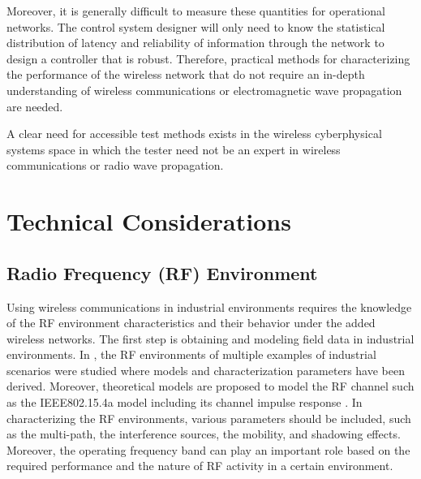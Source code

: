 Moreover, it is generally difficult to measure these quantities for operational networks. The control system designer will only need to know the statistical distribution of latency and reliability of information through the network to design a controller that is robust. Therefore, practical methods for characterizing the performance of the wireless network that do not require an in-depth understanding of wireless communications or electromagnetic wave propagation are needed.

\begin{emphbox}
	A clear need for accessible test methods exists in the wireless cyberphysical systems space in which the tester need not be an expert in wireless communications or radio wave propagation.
\end{emphbox}

    
    \section{Technical Considerations}

    \subsection{Radio Frequency (RF) Environment}
   Using wireless communications in industrial environments requires the knowledge of the RF environment characteristics and their behavior under the added wireless networks. The first step is obtaining and modeling field data in industrial environments. In \cite{Candell2017}, the RF environments of multiple examples of industrial scenarios were studied where models and characterization parameters have been derived. Moreover, theoretical models are proposed to model the RF channel such as the IEEE802.15.4a model including its channel impulse response \cite{A.F.Molisch2004}. In characterizing the RF environments, various parameters should be included, such as the multi-path, the interference sources, the mobility, and shadowing effects. Moreover, the operating frequency band can play an important role based on the required performance and the nature of RF activity in a certain environment.
   
    
